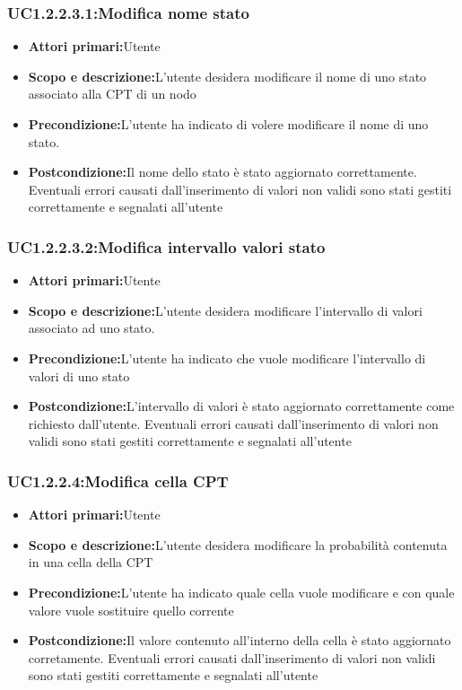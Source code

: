\subsubsection{UC1.2.2.3.1:Modifica nome stato}
\begin{itemize}
	\item{\textbf{Attori primari:}Utente}
	\item{\textbf{Scopo e descrizione:}L'utente desidera modificare il nome di uno stato associato alla CPT di un nodo}
	\item{\textbf{Precondizione:}L'utente ha indicato di volere modificare il nome di uno stato.}
	\item{\textbf{Postcondizione:}Il nome dello stato è stato aggiornato correttamente. Eventuali errori causati dall'inserimento di valori non validi sono stati gestiti correttamente e segnalati all'utente}
\end{itemize}
\subsubsection{UC1.2.2.3.2:Modifica intervallo valori stato}
\begin{itemize}
	\item{\textbf{Attori primari:}Utente}
	\item{\textbf{Scopo e descrizione:}L'utente desidera modificare l'intervallo di valori associato ad uno stato.}
	\item{\textbf{Precondizione:}L'utente ha indicato che vuole modificare l'intervallo di valori di uno stato}
	\item{\textbf{Postcondizione:}L'intervallo di valori è stato aggiornato correttamente come richiesto dall'utente. Eventuali errori causati dall'inserimento di valori non validi sono stati gestiti correttamente e segnalati all'utente}
\end{itemize}
\subsubsection{UC1.2.2.4:Modifica cella CPT}
\begin{itemize}
	\item{\textbf{Attori primari:}Utente}
	\item{\textbf{Scopo e descrizione:}L'utente desidera modificare la probabilità contenuta in una cella della CPT}
	\item{\textbf{Precondizione:}L'utente ha indicato quale cella vuole modificare e con quale valore vuole sostituire quello corrente}
	\item{\textbf{Postcondizione:}Il valore contenuto all'interno della cella è stato aggiornato corretamente. Eventuali errori causati dall'inserimento di valori non validi sono stati gestiti correttamente e segnalati all'utente}
\end{itemize}
